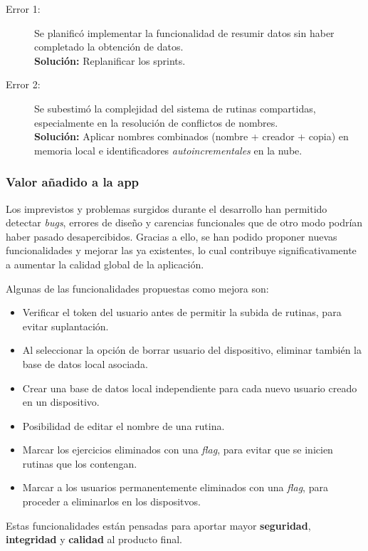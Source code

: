 \begin{description}
  \item[Error 1:] Se planific\'o implementar la funcionalidad de resumir datos sin haber completado la obtenci\'on de datos. \\ \textbf{Soluci\'on:} Replanificar los sprints.
  \item[Error 2:] Se subestim\'o la complejidad del sistema de rutinas compartidas, especialmente en la resoluci\'on de conflictos de nombres. \\ \textbf{Soluci\'on:} Aplicar nombres combinados (nombre + creador + copia) en memoria local e identificadores \textit{autoincrementales} en la nube.
\end{description}

\subsubsection{Valor a\~nadido a la app}
Los imprevistos y problemas surgidos durante el desarrollo han permitido detectar \textit{bugs}, errores de dise\~no y carencias funcionales que de otro modo podr\'ian haber pasado desapercibidos. Gracias a ello, se han podido proponer nuevas funcionalidades y mejorar las ya existentes, lo cual contribuye significativamente a aumentar la calidad global de la aplicaci\'on.

Algunas de las funcionalidades propuestas como mejora son:

\begin{itemize}
  \item Verificar el token del usuario antes de permitir la subida de rutinas, para evitar suplantación.
  \item Al seleccionar la opci\'on de borrar usuario del dispositivo, eliminar tambi\'en la base de datos local asociada.
  \item Crear una base de datos local independiente para cada nuevo usuario creado en un dispositivo.
  \item Posibilidad de editar el nombre de una rutina.
  \item Marcar los ejercicios eliminados con una \textit{flag}, para evitar que se inicien rutinas que los contengan.
  \item Marcar a los usuarios permanentemente eliminados con una \textit{flag}, para proceder a eliminarlos en los dispositvos.
\end{itemize}

Estas funcionalidades est\'an pensadas para aportar mayor \textbf{seguridad}, \textbf{integridad} y \textbf{calidad} al producto final.

